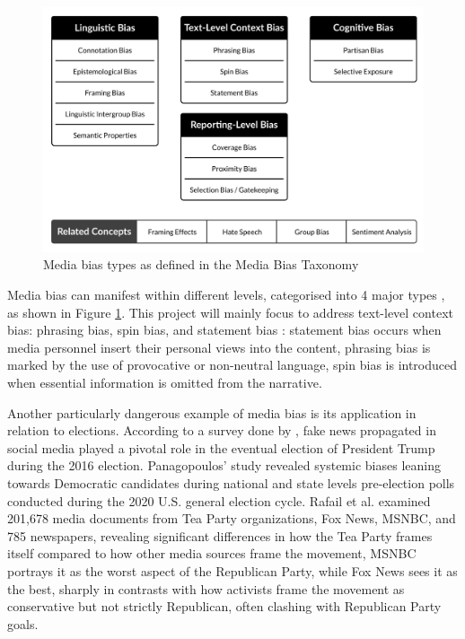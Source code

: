 \begin{figure}[htbp]
    \centering
    \includegraphics[width=0.9\linewidth]{images/bias-types-taxonomy.png}
    \caption{Media bias types as defined in the Media Bias Taxonomy \cite{spinde-2024-taxonomy}}
    \label{fig:bias-types-taxonomy}
\end{figure}

Media bias can manifest within different levels, categorised into 4 major types \cite{spinde-2024-taxonomy}, as shown in Figure \ref{fig:bias-types-taxonomy}. This project will mainly focus to address text-level context bias: phrasing bias, spin bias, and statement bias \cite{spinde-2024-taxonomy}: statement bias occurs when media personnel insert their personal views into the content, phrasing bias is marked by the use of provocative or non-neutral language, spin bias is introduced when essential information is omitted from the narrative.

Another particularly dangerous example of media bias is its application in relation to elections. According to a survey done by \cite{allcott-2017-socialmedia-2016election}, fake news propagated in social media played a pivotal role in the eventual election of President Trump during the 2016 election. Panagopoulos' study \cite{panagopoulos-2020} revealed systemic biases leaning towards Democratic candidates during national and state levels pre-election polls conducted during the 2020 U.S. general election cycle. Rafail et al. \cite{rafail-2018-tea-party} examined 201,678 media documents from Tea Party organizations, Fox News, MSNBC, and 785 newspapers, revealing significant differences in how the Tea Party frames itself compared to how other media sources frame the movement, MSNBC portrays it as the worst aspect of the Republican Party, while Fox News sees it as the best, sharply in contrasts with how activists frame the movement as conservative but not strictly Republican, often clashing with Republican Party goals.

